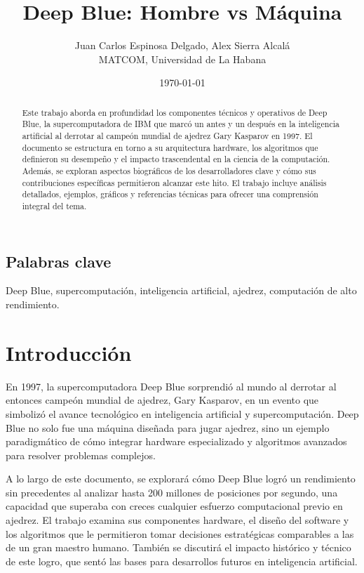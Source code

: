 \documentclass[12pt,a4paper]{article}
\title{\textbf{Deep Blue: Hombre vs Máquina}}
\author{Juan Carlos Espinosa Delgado, Alex Sierra Alcalá \\ MATCOM, Universidad de La Habana}
\date{\today}
\begin{document}
\maketitle
\newpage

\begin{titlepage}
    \centering
    \begin{abstract}
        Este trabajo aborda en profundidad los componentes técnicos y operativos de Deep Blue, la supercomputadora de IBM que marcó un antes y un después en la inteligencia artificial al derrotar al campeón mundial de ajedrez Gary Kasparov en 1997. El documento se estructura en torno a su arquitectura hardware, los algoritmos que definieron su desempeño y el impacto trascendental en la ciencia de la computación. Además, se exploran aspectos biográficos de los desarrolladores clave y cómo sus contribuciones específicas permitieron alcanzar este hito. El trabajo incluye análisis detallados, ejemplos, gráficos y referencias técnicas para ofrecer una comprensión integral del tema.
    \end{abstract}
    \section*{Palabras clave}
    Deep Blue, supercomputación, inteligencia artificial, ajedrez, computación de alto rendimiento.
\end{titlepage}


\newpage
\tableofcontents
\newpage

\section{Introducción}
En 1997, la supercomputadora Deep Blue sorprendió al mundo al derrotar al entonces campeón mundial de ajedrez, Gary Kasparov, en un evento que simbolizó el avance tecnológico en inteligencia artificial y supercomputación. Deep Blue no solo fue una máquina diseñada para jugar ajedrez, sino un ejemplo paradigmático de cómo integrar hardware especializado y algoritmos avanzados para resolver problemas complejos. 

A lo largo de este documento, se explorará cómo Deep Blue logró un rendimiento sin precedentes al analizar hasta 200 millones de posiciones por segundo, una capacidad que superaba con creces cualquier esfuerzo computacional previo en ajedrez. El trabajo examina sus componentes hardware, el diseño del software y los algoritmos que le permitieron tomar decisiones estratégicas comparables a las de un gran maestro humano. También se discutirá el impacto histórico y técnico de este logro, que sentó las bases para desarrollos futuros en inteligencia artificial.
\end{document}
